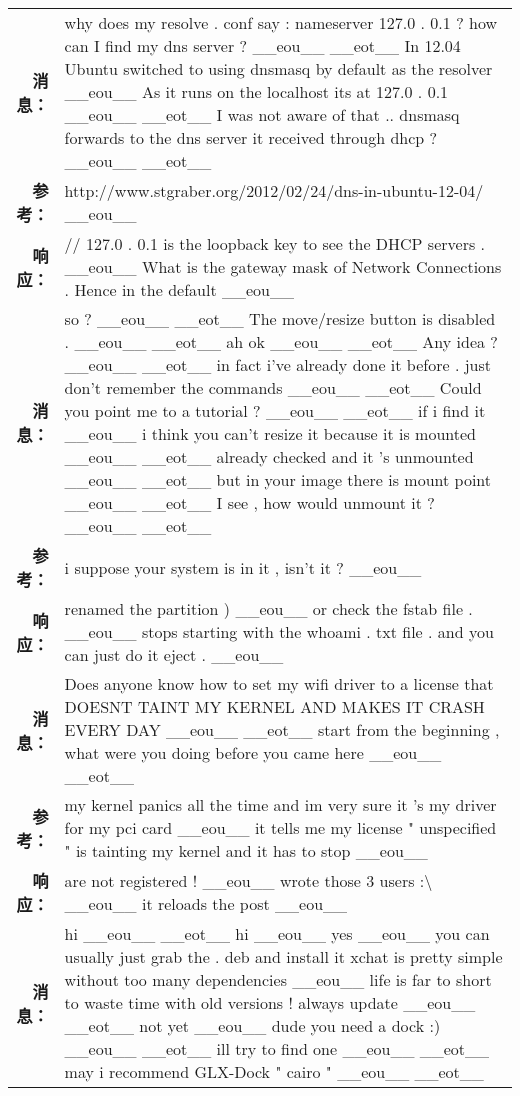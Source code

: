 \begin{tabularx}{\textwidth}{@{}rX@{}}
\midrule%
\textbf{消息：}&why does my resolve . conf say : nameserver 127.0 . 0.1 ? how can I find my dns server ? \_\_eou\_\_ \_\_eot\_\_ In 12.04 Ubuntu switched to using dnsmasq by default as the resolver \_\_eou\_\_ As it runs on the localhost its at 127.0 . 0.1 \_\_eou\_\_ \_\_eot\_\_ I was not aware of that .. dnsmasq forwards to the dns server it received through dhcp ? \_\_eou\_\_ \_\_eot\_\_\\%
\textbf{参考：}&http://www.stgraber.org/2012/02/24/dns{-}in{-}ubuntu{-}12{-}04/ \_\_eou\_\_\\%
\textbf{响应：}&// 127.0 . 0.1 is the loopback key to see the DHCP servers . \_\_eou\_\_ What is the gateway mask of Network Connections . Hence in the default \_\_eou\_\_\\%
\midrule%
\textbf{消息：}&so ? \_\_eou\_\_ \_\_eot\_\_ The move/resize button is disabled . \_\_eou\_\_ \_\_eot\_\_ ah ok \_\_eou\_\_ \_\_eot\_\_ Any idea ? \_\_eou\_\_ \_\_eot\_\_ in fact i've already done it before . just don't remember the commands \_\_eou\_\_ \_\_eot\_\_ Could you point me to a tutorial ? \_\_eou\_\_ \_\_eot\_\_ if i find it \_\_eou\_\_ i think you can't resize it because it is mounted \_\_eou\_\_ \_\_eot\_\_ already checked and it 's unmounted \_\_eou\_\_ \_\_eot\_\_ but in your image there is mount point \_\_eou\_\_ \_\_eot\_\_ I see , how would unmount it ? \_\_eou\_\_ \_\_eot\_\_\\%
\textbf{参考：}&i suppose your system is in it , isn't it ? \_\_eou\_\_\\%
\textbf{响应：}&renamed the partition ) \_\_eou\_\_ or check the fstab file . \_\_eou\_\_ stops starting with the whoami . txt file . and you can just do it eject . \_\_eou\_\_\\%
\midrule%
\textbf{消息：}&Does anyone know how to set my wifi driver to a license that DOESNT TAINT MY KERNEL AND MAKES IT CRASH EVERY DAY \_\_eou\_\_ \_\_eot\_\_ start from the beginning , what were you doing before you came here \_\_eou\_\_ \_\_eot\_\_\\%
\textbf{参考：}&my kernel panics all the time and im very sure it 's my driver for my pci card \_\_eou\_\_ it tells me my license " unspecified " is tainting my kernel and it has to stop \_\_eou\_\_\\%
\textbf{响应：}&are not registered ! \_\_eou\_\_ wrote those 3 users :\textbackslash{} \_\_eou\_\_ it reloads the post \_\_eou\_\_\\%
\midrule%
\textbf{消息：}&hi \_\_eou\_\_ \_\_eot\_\_ hi \_\_eou\_\_ yes \_\_eou\_\_ you can usually just grab the . deb and install it xchat is pretty simple without too many dependencies \_\_eou\_\_ life is far to short to waste time with old versions ! always update \_\_eou\_\_ \_\_eot\_\_ not yet \_\_eou\_\_ dude you need a dock :) \_\_eou\_\_ \_\_eot\_\_ ill try to find one \_\_eou\_\_ \_\_eot\_\_ may i recommend GLX{-}Dock " cairo " \_\_eou\_\_ \_\_eot\_\_\\%

\end{tabularx}
